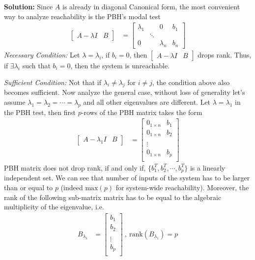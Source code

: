 \documentclass[twoside]{article}
\begin{document}
\textbf{Solution:} Since $A$ is already in diagonal Canonical 
form, the most convenient way to analyze reachability is the PBH's modal
test 
%
\begin{align*}
  \left[ \begin{array}{c|c} A - \lambda I & B \end{array} \right]
  &= \left[ \begin{array}{ccc|c} 
  \lambda_1 & & 0 & b_1 \\
    & \ddots &
    \\
    0 & &  \lambda_n & b_n \end{array} \right]
\end{align*}
%
\textit{Necessary Condition:} Let $\lambda = \lambda_i$, if $b_i = 0$,
then $\left[ \begin{array}{c|c} A - \lambda I & B \end{array} \right]$
drops rank. Thus, if $\exists \lambda_i$ such that $b_i = 0$, then the system 
is unreachable. 

\textit{Sufficient Condition:} Not that if $\lambda_i \neq \lambda_j$ for $i \neq j$,
the condition above also becomes sufficient. Now analyze the general case, without loss 
of generality let's assume $\lambda_1 = \lambda_2 = \cdots = \lambda_p$ and all other 
eigenvalues are different. Let $\lambda = \lambda_1$ in the PBH test, then first $p$-rows of the
PBH matrix takes the form
%
\begin{align*}
  \left[ \begin{array}{c|c} A - \lambda_1 I & B \end{array} \right]
  &= \left[ \begin{array}{c|c} 
  0_{1 \times n} & b_1 \\
  0_{1 \times n}  & b_2 \\
  \\
  \vdots
  \\
  0_{1 \times n}  & b_p \\
     \end{array} \right]
\end{align*}
%
PBH matrix does not drop rank, if and only if, $\lbrace b_1^T , b_2^T , \cdots , b_p^T \rbrace$ 
is a linearly independent set. We can see that number of inputs of the system has to be larger than 
or equal to $p$ (indeed $\mathrm{max}(p)$ for system-wide reachability). Moreover, the rank of the 
following sub-matrix matrix has to be equal to the algebraic multiplicity of the eigenvalue, i.e.
%
\begin{align*}
  B_{\lambda_1}
  &= \left[ \begin{array}{c} 
  b_1 \\
   b_2 \\
  \\
  \vdots
  \\
   b_p \\
     \end{array} \right] \ , \ \mathrm{rank}(B_{\lambda_1}) = p  
\end{align*}
%
\end{document}
